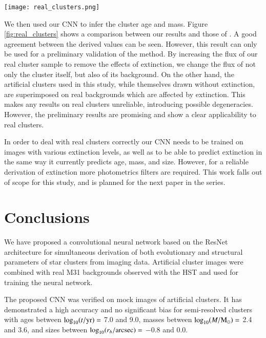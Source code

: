 \documentclass{aa}
\begin{document}
\begin{figure*}
    \centering
    \texttt{[image: real\_clusters.png]}
    \caption{Comparison of ages (a) and masses (b) derived by \cite{2017A&A...602A.112D} and our CNN for 157 real PHAT clusters located in bricks 19-22. The correlation coefficient $\rho$ between values is displayed in the top-left of each subfigure.}
    \label{fig:real_clusters}
\end{figure*}

We then used our CNN to infer the cluster age and mass. Figure \ref{fig:real_clusters} shows a comparison between our results and those of \cite{2017A&A...602A.112D}. A good agreement between the derived values can be seen. However, this result can only be used for a preliminary validation of the method. By increasing the flux of our real cluster sample to remove the effects of extinction, we change the flux of not only the cluster itself, but also of its background. On the other hand, the artificial clusters used in this study, while themselves drawn without extinction, are superimposed on real backgrounds which are affected by extinction. This makes any results on real clusters unreliable, introducing possible degeneracies. However, the preliminary results are promising and show a clear applicability to real clusters.

In order to deal with real clusters correctly our CNN needs to be trained on images with various extinction levels, as well as to be able to predict extinction in the same way it currently predicts age, mass, and size. However, for a reliable derivation of extinction more photometrics filters are required. This work falls out of scope for this study, and is planned for the next paper in the series.

\section{Conclusions} \label{sec:conclusions}
We have proposed a convolutional neural network based on the ResNet architecture for simultaneous derivation of both evolutionary and structural parameters of star clusters from imaging data. Artificial cluster images were combined with real M31 backgrounds observed with the HST and used for training the neural network.

The proposed CNN was verified on mock images of artificial clusters. It has demonstrated a high accuracy and no significant bias for semi-resolved clusters with ages between $\log_{10}(t/{\rm yr})=$ 7.0 and 9.0, masses between $\log_{10}(M/{\rm M_\odot})=$ 2.4 and 3.6, and sizes between $\log_{10}(r_h/{\rm arcsec})=$ $-0.8$ and 0.0.
\end{document}
